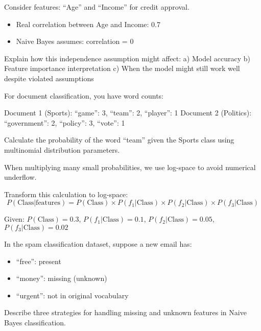 \documentclass{article}
\newcounter{exercise}
\begin{document}
\begin{tcolorbox}[colback=gray!5!white,colframe=gray!75!black,title=Problem \stepcounter{exercise}: Independence Assumption Analysis]

Consider features: ``Age'' and ``Income'' for credit approval.
\begin{itemize}
    \item Real correlation between Age and Income: 0.7
    \item Naive Bayes assumes: correlation = 0
\end{itemize}

Explain how this independence assumption might affect:
a) Model accuracy
b) Feature importance interpretation
c) When the model might still work well despite violated assumptions
\end{tcolorbox}

\begin{tcolorbox}[colback=gray!5!white,colframe=gray!75!black,title=Problem \stepcounter{exercise}: Multinomial Naive Bayes]

For document classification, you have word counts:

Document 1 (Sports): ``game'': 3, ``team'': 2, ``player'': 1
Document 2 (Politics): ``government'': 2, ``policy'': 3, ``vote'': 1

Calculate the probability of the word ``team'' given the Sports class using multinomial distribution parameters.
\end{tcolorbox}

\begin{tcolorbox}[colback=gray!5!white,colframe=gray!75!black,title=Problem \stepcounter{exercise}: Log-Space Computation]

When multiplying many small probabilities, we use log-space to avoid numerical underflow.

Transform this calculation to log-space:
$$P(\text{Class}|\text{features}) = P(\text{Class}) \times P(f_1|\text{Class}) \times P(f_2|\text{Class}) \times P(f_3|\text{Class})$$

Given: $P(\text{Class}) = 0.3$, $P(f_1|\text{Class}) = 0.1$, $P(f_2|\text{Class}) = 0.05$, $P(f_3|\text{Class}) = 0.02$
\end{tcolorbox}

\begin{tcolorbox}[colback=gray!5!white,colframe=gray!75!black,title=Problem \stepcounter{exercise}: Handling Missing Features]

In the spam classification dataset, suppose a new email has:
\begin{itemize}
    \item ``free'': present
    \item ``money'': missing (unknown)
    \item ``urgent'': not in original vocabulary
\end{itemize}

Describe three strategies for handling missing and unknown features in Naive Bayes classification.
\end{tcolorbox}
\end{document}
